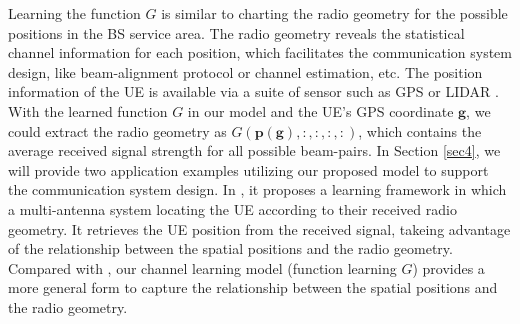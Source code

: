 \documentclass[12pt, draftcls, onecolumn]{IEEEtran}
\theoremstyle{plain}
\theoremstyle{definition}
\theoremstyle{remark}
\newcommand{\nt}[1]{\textcolor{red}{\textbf{[#1]}}}
\begin{document}
Learning the function $G$ is similar to charting the radio geometry for the possible positions in the BS service area.
The radio geometry reveals the statistical channel information for each position, which facilitates the communication system design, like beam-alignment protocol or channel estimation, etc.
The position information of the UE is available via a suite of sensor such as GPS or LIDAR \cite{Va2018, 7535489}.
With the learned function $G$ in our model and the UE's GPS coordinate $\mathbf{g}$, we could extract the radio geometry as $G(\mathbf{p}(\mathbf g),:,:,:,:)$, which contains the average received signal strength for all possible beam-pairs.
In Section \ref{sec4}, we will provide two application examples utilizing our proposed model to support the communication system design.
In \cite{8444621}, it proposes a learning framework in which a multi-antenna system locating the UE according to their received radio geometry.
It retrieves the UE position from the received signal, takeing advantage of the relationship between the spatial positions and the radio geometry.
Compared with \cite{8444621}, our channel learning model (function learning $G$) provides a more general form to capture the relationship between the spatial positions and the radio geometry.
\end{document}
